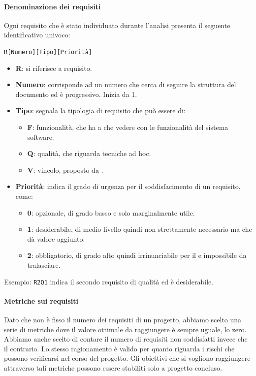 		\paragraph{Denominazione dei requisiti}\label{PP:Sviluppo:AdR:DenominazioneRequisiti}
		Ogni requisito che è stato individuato durante l'analisi presenta il seguente identificativo univoco:
		\begin{center}
			\texttt{R[Numero][Tipo][Priorità]}
		\end{center}

		\begin{itemize}
			\item \textbf{R}: si riferisce a requisito.
		 	\item \textbf{Numero}: corrisponde ad un numero che cerca di seguire la struttura del documento ed è progressivo. Inizia da 1.
		 	\item \textbf{Tipo}: segnala la tipologia di requisito che può essere di:
		 	\begin{itemize}
		 		\item \textbf{F}: funzionalità, che ha a che vedere con le funzionalità del sistema software.
		 		\item \textbf{Q}: qualità, che riguarda tecniche ad hoc.
		 		\item \textbf{V}: vincolo, proposto da \II.
		 	\end{itemize}
	 		\item \textbf{Priorità}: indica il grado di urgenza per il soddisfacimento di un requisito, come:
	 		\begin{itemize}
	 			\item \textbf{0}: opzionale, di grado basso e solo marginalmente utile.
	 			\item \textbf{1}: desiderabile, di medio livello quindi non strettamente necessario ma che dà valore aggiunto.
	 			\item \textbf{2}: obbligatorio, di grado alto quindi irrinunciabile per il  e impossibile da tralasciare.
	 		\end{itemize}
		\end{itemize}

		Esempio: \texttt{R2Q1} indica il secondo requisito di qualità ed è desiderabile.


		\paragraph{Metriche sui requisiti}\label{MetricheAdR}
		Dato che non è fisso il numero dei requisiti di un progetto, abbiamo scelto una serie di metriche dove il valore ottimale da raggiungere è sempre uguale, lo zero. Abbiamo anche scelto di contare il numero di requisiti non soddisfatti invece che il contrario. Lo stesso ragionamento è valido per quanto	riguarda i rischi che possono verificarsi nel corso del progetto.
		Gli obiettivi che si vogliono raggiungere attraverso tali metriche possono essere stabiliti solo a progetto concluso.

